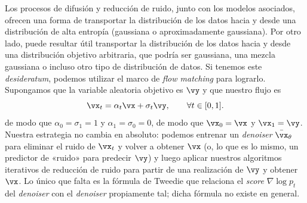 \documentclass[../../book-main.tex]{subfiles}
\begin{document}
\begin{remark}\label{rem:flow_matching}
    Los procesos de difusión y reducción de ruido, junto con los modelos asociados, ofrecen una
    forma de transportar la distribución de los datos hacia y desde una distribución de alta entropía
    (gaussiana o aproximadamente gaussiana). Por otro lado,
    puede resultar útil transportar la distribución de los datos hacia y desde una
    distribución objetivo arbitraria, que podría ser gaussiana, una
    mezcla gaussiana o incluso otro tipo de distribución de datos. Si
    tenemos este \textit{desideratum}, podemos utilizar el marco de \textit{flow matching}
    para lograrlo. Supongamos que la variable aleatoria objetivo es
    \(\vy\) y que nuestro flujo es
    \begin{equation}
        \vx_{t} = \alpha_{t}\vx + \sigma_{t}\vy, \qquad \forall t \in [0, 1].
    \end{equation}
    de modo que \(\alpha_{0} = \sigma_{1} = 1\) y \(\alpha_{1} =
    \sigma_{0} = 0\), de modo que \(\vx_{0} = \vx\) y \(\vx_{1} =
    \vy\). Nuestra estrategia no cambia en absoluto: podemos
    entrenar un \textit{denoiser} \(\bar{\vx}_{\theta}\) para eliminar el ruido de
    \(\vx_{t}\) y volver a obtener \(\vx\) (o, lo que es lo mismo, un predictor de «ruido»
    para predecir \(\vy\)) y luego aplicar nuestros algoritmos iterativos
    de reducción de ruido para partir de una realización de \(\vy\) y
    obtener \(\vx\). Lo único que falta es la fórmula de Tweedie que
    relaciona el \textit{score} \(\nabla \log p_{t}\) del \textit{denoiser} con el
    \textit{denoiser} propiamente tal; dicha fórmula no existe en general.


\end{remark}
\end{document}
